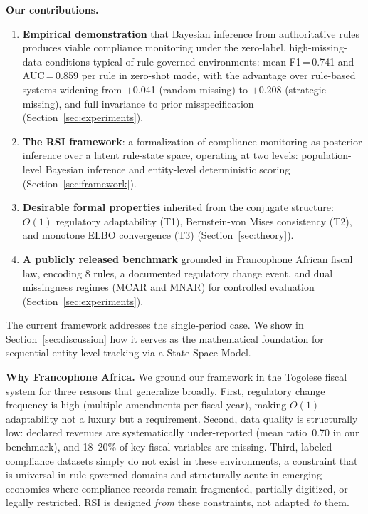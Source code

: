 \documentclass[letterpaper]{article}
\begin{document}
\medskip
\noindent\textbf{Our contributions.}
\begin{enumerate}[leftmargin=2em, label=(\arabic*)]
  \item \textbf{Empirical demonstration} that Bayesian inference from
        authoritative rules produces viable compliance monitoring
        under the zero-label, high-missing-data conditions typical of
        rule-governed environments: mean F1\,=\,0.741 and
        AUC\,=\,0.859 per rule in zero-shot mode, with the advantage
        over rule-based systems widening from $+$0.041 (random missing)
        to $+$0.208 (strategic missing), and full invariance to prior
        misspecification (Section~\ref{sec:experiments}).
  \item \textbf{The RSI framework}: a formalization of compliance
        monitoring as posterior inference over a latent rule-state
        space, operating at two levels: population-level Bayesian
        inference and entity-level deterministic scoring
        (Section~\ref{sec:framework}).
  \item \textbf{Desirable formal properties} inherited from the
        conjugate structure: $O(1)$ regulatory adaptability (T1),
        Bernstein-von Mises consistency (T2), and monotone ELBO
        convergence (T3) (Section~\ref{sec:theory}).
  \item \textbf{A publicly released benchmark} grounded in
        Francophone African fiscal law, encoding 8 rules, a
        documented regulatory change event, and dual missingness
        regimes (MCAR and MNAR) for controlled evaluation
        (Section~\ref{sec:experiments}).
\end{enumerate}

\noindent The current framework addresses the single-period case. We
show in Section~\ref{sec:discussion} how it serves as the mathematical
foundation for sequential entity-level tracking via a State Space Model.

\medskip
\noindent\textbf{Why Francophone Africa.}
We ground our framework in the Togolese fiscal system for three reasons
that generalize broadly. First, regulatory change frequency is high
(multiple amendments per fiscal year), making $O(1)$ adaptability not
a luxury but a requirement. Second, data quality is structurally low:
declared revenues are systematically under-reported (mean ratio~0.70
in our benchmark), and 18--20\% of key fiscal variables are missing.
Third, labeled compliance datasets simply do not exist in these
environments, a constraint that is universal in rule-governed domains
and structurally acute in emerging economies where compliance records
remain fragmented, partially digitized, or legally restricted.
RSI is designed \emph{from} these constraints, not adapted \emph{to}
them.
\end{document}
